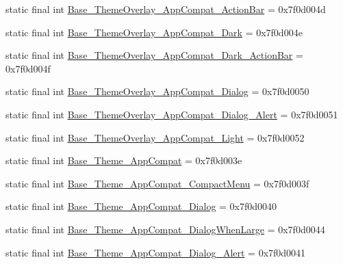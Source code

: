 \begin{DoxyCompactItemize}
\item 
static final int \mbox{\hyperlink{classandroid_1_1support_1_1design_1_1_r_1_1style_a49d2551281a2c988061aae003f74c3f9}{Base\+\_\+\+Theme\+Overlay\+\_\+\+App\+Compat\+\_\+\+Action\+Bar}} = 0x7f0d004d
\item 
static final int \mbox{\hyperlink{classandroid_1_1support_1_1design_1_1_r_1_1style_afb4e6370b2f51731f72ec339323a5457}{Base\+\_\+\+Theme\+Overlay\+\_\+\+App\+Compat\+\_\+\+Dark}} = 0x7f0d004e
\item 
static final int \mbox{\hyperlink{classandroid_1_1support_1_1design_1_1_r_1_1style_a1981c4bc88e3e9762aee9a2a5644ce44}{Base\+\_\+\+Theme\+Overlay\+\_\+\+App\+Compat\+\_\+\+Dark\+\_\+\+Action\+Bar}} = 0x7f0d004f
\item 
static final int \mbox{\hyperlink{classandroid_1_1support_1_1design_1_1_r_1_1style_a52662dc6ef309cb237e2d2965c0ca1e2}{Base\+\_\+\+Theme\+Overlay\+\_\+\+App\+Compat\+\_\+\+Dialog}} = 0x7f0d0050
\item 
static final int \mbox{\hyperlink{classandroid_1_1support_1_1design_1_1_r_1_1style_a1b11d2332368be4301995110f2cbe7fd}{Base\+\_\+\+Theme\+Overlay\+\_\+\+App\+Compat\+\_\+\+Dialog\+\_\+\+Alert}} = 0x7f0d0051
\item 
static final int \mbox{\hyperlink{classandroid_1_1support_1_1design_1_1_r_1_1style_a78157e543905b00fcad717119cee6e6b}{Base\+\_\+\+Theme\+Overlay\+\_\+\+App\+Compat\+\_\+\+Light}} = 0x7f0d0052
\item 
static final int \mbox{\hyperlink{classandroid_1_1support_1_1design_1_1_r_1_1style_a0ecc8c4b192cb936ce1a2d29da08d931}{Base\+\_\+\+Theme\+\_\+\+App\+Compat}} = 0x7f0d003e
\item 
static final int \mbox{\hyperlink{classandroid_1_1support_1_1design_1_1_r_1_1style_a5e099ee9a441023f84d082b6ea016c0c}{Base\+\_\+\+Theme\+\_\+\+App\+Compat\+\_\+\+Compact\+Menu}} = 0x7f0d003f
\item 
static final int \mbox{\hyperlink{classandroid_1_1support_1_1design_1_1_r_1_1style_adb73b5d52d821420c1e34cfaabb62587}{Base\+\_\+\+Theme\+\_\+\+App\+Compat\+\_\+\+Dialog}} = 0x7f0d0040
\item 
static final int \mbox{\hyperlink{classandroid_1_1support_1_1design_1_1_r_1_1style_a13ba16ca33b97a860d5376eb50a4a4cf}{Base\+\_\+\+Theme\+\_\+\+App\+Compat\+\_\+\+Dialog\+When\+Large}} = 0x7f0d0044
\item 
static final int \mbox{\hyperlink{classandroid_1_1support_1_1design_1_1_r_1_1style_a050729902da0b8b24cc910dd938eef5d}{Base\+\_\+\+Theme\+\_\+\+App\+Compat\+\_\+\+Dialog\+\_\+\+Alert}} = 0x7f0d0041

\end{DoxyCompactItemize}
